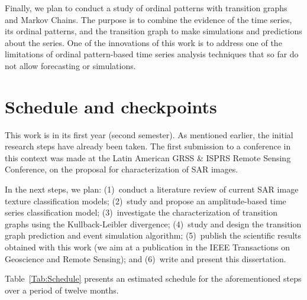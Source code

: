\documentclass[paper=letter, fontsize=12pt]{article}
\begin{document}
Finally, we plan to conduct a study of ordinal patterns with transition graphs and Markov Chains.
The purpose is to combine the evidence of the time series, its ordinal patterns, and the transition graph to make simulations and predictions about the series.
One of the innovations of this work is to address one of the limitations of ordinal pattern-based time series analysis techniques that so far do not allow forecasting or simulations.


\section{Schedule and checkpoints}\label{sec:checkpoint}

This work is in its first year (second semester). 
As mentioned earlier, the initial research steps have already been taken.
The first submission to a conference in this context was made at the Latin American GRSS \& ISPRS Remote Sensing Conference, on the proposal for characterization of SAR images.

In the next steps, we plan:
(1)~conduct a literature review of current SAR image texture classification models;
(2)~study and propose an amplitude-based time series classification model;
(3)~investigate the characterization of transition graphs using the Kullback-Leibler divergence; 
(4)~study and design the transition graph prediction and event simulation algorithm; 
(5)~publish the scientific results obtained with this work (we aim at a publication in the IEEE Transactions on Geoscience and Remote Sensing); and
(6)~write and present this dissertation.

Table~\ref{Tab:Schedule} presents an estimated schedule for the aforementioned steps over a period of twelve months.
\end{document}
